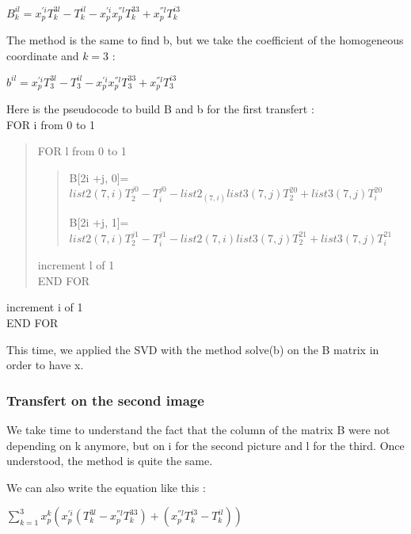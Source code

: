 \documentclass{report}
\begin{document}
\begin{center}
$B_{k}^{il} = x_{p}^{'i}T_{k}^{3l} - T_{k}^{il} - x_{p}^{'i}x_{p}^{''l}T_{k}^{33} + x_{p}^{''l}T_{k}^{i3}$
\end{center}

The method is the same to find b, but we take the coefficient of the homogeneous coordinate and $k=3$ : 

\begin{center}
$b^{il} = x_{p}^{'i}T_{3}^{3l} - T_{3}^{il} - x_{p}^{'i}x_{p}^{''l}T_{3}^{33} + x_{p}^{''l}T_{3}^{i3}$
\end{center}


Here is the pseudocode to build B and b for the first transfert : 
\\FOR i from 0 to 1
		\begin{verse}
		FOR l from 0 to 1
\begin{verse}
\begin{list}{•}{•}
\item 
B[2i +j, 0]= $list2(7,i)T_{2}^{j0} - T_{i}^{j0} - list2_(7,i)list3(7,j)T_{2}^{20} + list3(7,j)T_{i}^{20}$
\item 
B[2i +j, 1]= $list2(7,i)T_{2}^{j1} - T_{i}^{j1} - list2(7,i)list3(7,j)T_{2}^{21} + list3(7,j)T_{i}^{21}$
\end{list}


\end{verse}
				increment l of 1			
		\\END FOR
		\end{verse}	
		increment i of 1
	\\END FOR

This time, we applied the SVD with the method solve(b) on the B matrix in order to have x. 

\subsubsection{Transfert on the second image}
We take time to understand the fact that the column of the matrix B were not depending on k anymore, but on i for the second picture and l for the third. Once understood, the method is quite the same. 

We can also write the equation like this : 

\begin{center}
 $ \displaystyle { \sum_{k = 1}^{3}} x_{p}^{k}(x_{p}^{'i} (T_{k}^{3l} - x_{p}^{''l}T_{k}^{33}) + ( x_{p}^{''l}T_{k}^{i3} - T_{k}^{il} ))$
\end{center}
\end{document}
